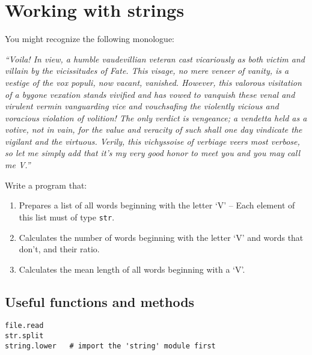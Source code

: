 \documentclass{article}
\begin{document}
\section*{Working with strings}
You might recognize the following monologue: \newline
\newline

\emph{
``Voila! In view, a humble vaudevillian veteran 
cast vicariously as both victim and villain by the vicissitudes of Fate. 
This visage, no mere veneer of vanity, is a vestige of the vox populi, now 
vacant, vanished. However, this valorous visitation of a bygone vexation stands 
vivified and has vowed to vanquish these venal and virulent vermin vanguarding 
vice and vouchsafing the violently vicious and voracious violation of volition! 
The only verdict is vengeance; a vendetta held as a votive, not in vain, for the
value and veracity of such shall one day vindicate the vigilant and the virtuous.
Verily, this vichyssoise of verbiage veers most verbose, so let me simply add 
that it's my very good honor to meet you and you may call me V.''
}
\newline \newline

Write a program that:
\begin{enumerate}
\item Prepares a list of all words beginning with the letter `V' -- Each
		element of this list must of type \texttt{str}.
\item Calculates the number of words beginning with the letter `V' and words that
	don't, and their ratio.
\item Calculates the mean length of all words beginning with  a `V'.

\end {enumerate}

\subsection*{Useful functions and methods}
\begin{verbatim}
file.read
str.split
string.lower   # import the 'string' module first
\end{verbatim}
\end{document}
